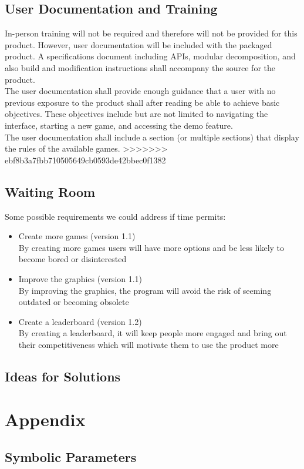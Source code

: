 \documentclass{article}
\begin{document}
		\subsection{User Documentation and Training}
			\indent In-person training will not be required and therefore will not be
			provided for this product. However, user documentation will be included with
			the packaged product. A specifications document including APIs, modular
			decomposition, and also build and modification instructions shall accompany
			the source for the product.\\
	 		\indent The user documentation shall provide enough guidance that a user
			with no previous exposure to the product shall after reading be able to
			achieve basic objectives. These objectives include but are not limited to
			navigating the interface, starting a new game, and accessing the demo
			feature.\\
	 		\indent The user documentation shall include a section (or multiple
			sections) that display the rules of the available games.
>>>>>>> ebf8b3a7fbb710505649cb0593de42bbec0f1382

		\subsection{Waiting Room}		
		\indent Some possible requirements we could address if time permits:\\
		\begin{itemize}
			\itemsep0em
			\item Create more games (version 1.1)\\
			By creating more games users will have more options and be less likely to
			become bored or disinterested
			\item Improve the graphics (version 1.1) \\
			By improving the graphics, the program will avoid the risk of seeming
			outdated or becoming obsolete
			\item Create a leaderboard (version 1.2)\\
			By creating a leaderboard, it will keep people more engaged and bring out
			their competitiveness which will motivate them to use the product more
		\end{itemize}		
		\subsection{Ideas for Solutions}
		
	\newpage
	\section{Appendix}
	\subsection{Symbolic Parameters}
		
\end{document}
